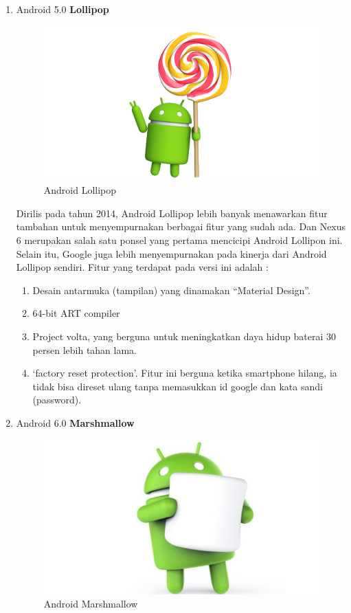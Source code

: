 \begin{enumerate}
\item Android 5.0 \textbf{Lollipop}\\
\begin{figure}[!htbp]
    \centering
    \includegraphics[scale =0.5]{pictures/android-lolipop.png}
    \caption{Android Lollipop}
    \label{}
\end{figure}

Dirilis pada tahun 2014, Android Lollipop lebih banyak menawarkan fitur tambahan untuk menyempurnakan berbagai fitur yang sudah ada. Dan Nexus 6 merupakan salah satu ponsel yang pertama mencicipi Android Lollipon ini. Selain itu, Google juga lebih menyempurnakan pada kinerja dari Android Lollipop sendiri. Fitur yang terdapat pada versi ini adalah : 
\begin{enumerate}
    \item Desain antarmuka (tampilan) yang dinamakan “Material Design”.
    \item 64-bit ART compiler
    \item Project volta, yang berguna untuk meningkatkan daya hidup baterai 30 persen lebih tahan lama.
    \item ‘factory reset protection’. Fitur ini berguna ketika smartphone hilang, ia tidak bisa direset ulang tanpa memasukkan id google dan kata sandi (password).
\end{enumerate}

\item Android 6.0 \textbf{Marshmallow}\\
\begin{figure}[!htbp]
    \centering
    \includegraphics[scale=0.3]{pictures/android-marshmallow.jpg}
    \caption{Android Marshmallow}
    \label{}
\end{figure}


\end{enumerate}
